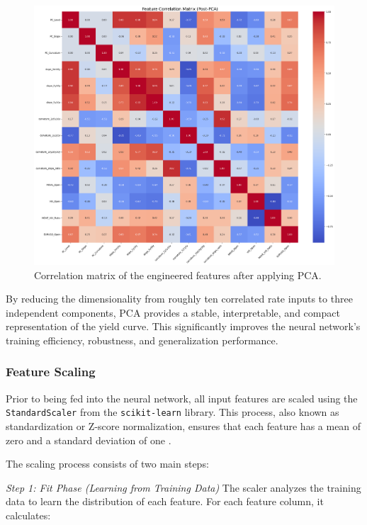 {\begin{figure}[H]
	\centering
	\includegraphics[width=1\textwidth]{images/features/feature_correlation_matrixPost-PCA.png}
	\caption{Correlation matrix of the engineered features after applying PCA.}
	\label{fig:feature_correlation_postPCA}
\end{figure}

By reducing the dimensionality from roughly ten correlated rate inputs to three independent components, PCA provides a stable, interpretable, and compact representation of the yield curve. This significantly improves the neural network’s training efficiency, robustness, and generalization performance.

\subsubsection{Feature Scaling}
Prior to being fed into the neural network, all input features are scaled using the \texttt{StandardScaler} from the \texttt{scikit-learn} library. This process, also known as standardization or Z-score normalization, ensures that each feature has a mean of zero and a standard deviation of one \parencite[pp.~31--32]{zheng2018feature}.

The scaling process consists of two main steps:

\textit{Step 1: Fit Phase (Learning from Training Data)}
The scaler analyzes the training data to learn the distribution of each feature. For each feature column, it calculates:

}
